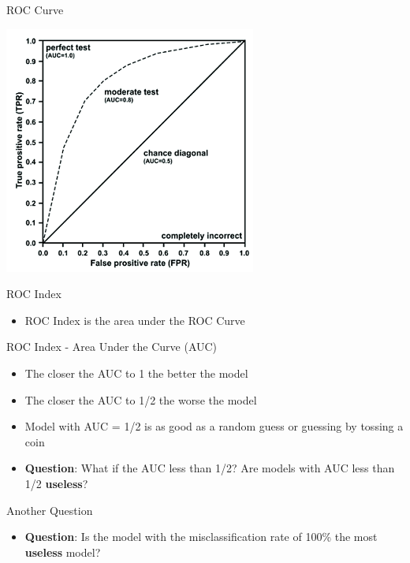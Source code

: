 \documentclass[
  ignorenonframetext,
]{beamer}
\providecommand{\tightlist}{%
  \setlength{\itemsep}{0pt}\setlength{\parskip}{0pt}}
\begin{document}
\begin{frame}{ROC Curve}
\protect\hypertarget{roc-curve-4}{}

\includegraphics{images/roc4.png}

\end{frame}

\begin{frame}{ROC Index}
\protect\hypertarget{roc-index}{}

\begin{itemize}
\tightlist
\item
  ROC Index is the area under the ROC Curve
\end{itemize}

\end{frame}

\begin{frame}{ROC Index - Area Under the Curve (AUC)}
\protect\hypertarget{roc-index---area-under-the-curve-auc}{}

\begin{itemize}
\item
  The closer the AUC to 1 the better the model
\item
  The closer the AUC to 1/2 the worse the model
\item
  Model with AUC = 1/2 is as good as a random guess or guessing by
  tossing a coin
\item
  \textbf{Question}: What if the AUC less than 1/2? Are models with AUC
  less than 1/2 \textbf{useless}?
\end{itemize}

\end{frame}

\begin{frame}{Another Question}
\protect\hypertarget{another-question}{}

\begin{itemize}
\tightlist
\item
  \textbf{Question}: Is the model with the misclassification rate of
  100\% the most \textbf{useless} model?
\end{itemize}

\end{frame}
\end{document}
